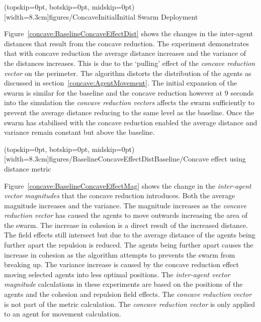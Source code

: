 \documentclass{ieeeaccess}
\begin{document}
\Figure[t!](topskip=0pt, botskip=0pt, midskip=0pt)[width=8.3cm]{figures/ConcaveInitial}{Initial Swarm Deployment\label{fig:ConcaveInitial}}

Figure~\ref{concave:BaselineConcaveEffectDist} shows the changes in the inter-agent distances that result from the concave reduction. The experiment demonstrates that with concave reduction the average distance increases and the variance of the distances increases. This is due to the `pulling' effect of the \textit{concave reduction vector} on the perimeter. The algorithm distorts the distribution of the agents as discussed in section~\ref{concave:AgentMovement}. The initial expansion of the swarm is similar for the baseline and the concave reduction however at 9 seconds into the simulation the \textit{concave reduction vectors} affects the swarm sufficiently to prevent the average distance reducing to the same level as the baseline. Once the swarm has stabilised with the concave reduction enabled the average distance and variance remain constant but above the baseline.

\Figure[t!](topskip=0pt, botskip=0pt, midskip=0pt)[width=8.3cm]{figures/BaselineConcaveEffectDist}{Baseline/Concave effect using distance metric\label{concave:BaselineConcaveEffectDist}}

Figure~\ref{concave:BaselineConcaveEffectMag} shows the change in the \textit{inter-agent vector magnitudes} that the concave reduction introduces. Both the average magnitude increases and the variance. The magnitude increases as the \textit{concave reduction vector} has caused the agents to move outwards increasing the area of the swarm. The increase in cohesion is a direct result of the increased distance. The field effects still intersect but due to the average distance of the agents being further apart the repulsion is reduced. The agents being further apart causes the increase in cohesion as the algorithm attempts to prevents the swarm from breaking up. The variance increase is caused by the concave reduction effect moving selected agents into less optimal positions.
The \textit{inter-agent vector magnitude} calculations in these experiments are based on the positions of the agents and the cohesion and repulsion field effects. The \textit{concave reduction vector} is not part of the metric calculation. The \textit{concave reduction vector} is only applied to an agent for movement calculation. 
\end{document}
